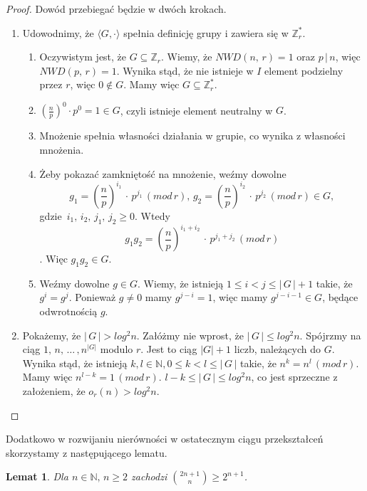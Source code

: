 \documentclass[declaration,shortabstract]{iithesis}
\theoremstyle{definition}
\theoremstyle{remark} \newtheorem{observation}{Obserwacja}
\theoremstyle{plain} \newtheorem{theorem}{Twierdzenie}
\theoremstyle{plain} \newtheorem{lemma}{Lemat}
\theoremstyle{remark} \newtheorem*{remark*}{Uwaga}
\theoremstyle{reminder} \newtheorem*{reminder*}{Przypomnienie}
\begin{document}
\begin{proof}
	Dowód przebiegać będzie w dwóch krokach.
	\begin{enumerate}[label=\arabic*.,leftmargin=.4in]
		\item Udowodnimy, że $\langle G, \cdot \rangle$ spełnia definicję grupy i zawiera się w $\mathbb{Z}_r^*$.
		      \begin{enumerate}[label=1.\arabic*.]
		      	\item Oczywistym jest, że $G \subseteq \mathbb{Z}_r$. Wiemy, że $NWD(n, \, r) = 1$ oraz $p \, | \, n$, więc $NWD(p, \, r) = 1$. Wynika stąd, że nie istnieje w $I$ element podzielny przez $r$, więc $0 \notin G$. Mamy więc $G \subseteq \mathbb{Z}_r^*$. 
		      	\item $(\frac{n}{p})^0\cdot p^0 = 1 \in G$, czyli istnieje element neutralny w $G$. 
		      	\item Mnożenie spełnia własności działania w grupie, co wynika z własności mnożenia.
		      	\item Żeby pokazać zamkniętość na mnożenie, weźmy dowolne \[g_1 = (\frac{n}{p})^{i_1} \, \cdot \, p^{j_1} \, (mod\,r), \, g_2 = (\frac{n}{p})^{i_2} \, \cdot \, p^{j_2}  \, (mod\,r) \in G,\] gdzie $\, i_1, \,i_2, \,j_1, \, j_2 \geq 0$. Wtedy \[g_1g_2 = (\frac{n}{p})^{i_1 + i_2} \, \cdot \, p^{j_1 + j_2} \, (mod\,r)\]. Więc $g_1g_2\in G$.
		      	\item Weźmy dowolne $g \in G$. Wiemy, że istnieją $1 \leq i < j \leq | \, G \, | + 1$ takie, że $g^i = g^j$. Ponieważ $g \neq 0$ mamy $g^{j - i} = 1$, więc mamy $g^{j - i - 1} \in G$, będące odwrotnością $g$.
		      \end{enumerate}
		\item Pokażemy, że $|\,G\,| > log^2n$. Załóżmy nie wprost, że $|\,G\,| \leq log^2n$. Spójrzmy na ciąg $1,\, n, \, \dots\,, n^{|G|}$ modulo $r$. Jest to ciąg $|G| + 1$ liczb, należących do $G$. Wynika stąd, że istnieją $k, l \in \mathbb{N}, 0 \leq k < l \leq |\,G\,|$ takie, że $n^k = n^l \, (mod\,r)$. Mamy więc $n^{l-k} = 1 \, (mod\,r)$. $l - k \leq |\,G\,| \leq log^2n$, co jest sprzeczne z założeniem, że $o_r(n) > log^2n$. 
	\end{enumerate}
\end{proof}

Dodatkowo w rozwijaniu nierówności w ostatecznym ciągu przekształceń skorzystamy z następującego lematu.

\begin{lemma}\label{newton1}
	Dla $n \in \mathbb{N}, \, n \geq 2$ zachodzi ${2n + 1 \choose n} \geq 2^{n+1}$.
\end{lemma}
	
\end{document}
